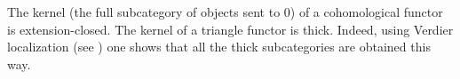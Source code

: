 \begin{exmp}
  The kernel (the full subcategory of objects sent to $0$) of a cohomological functor is extension-closed. The kernel of a triangle functor is thick. Indeed, using Verdier localization (see \cite{ver}) one shows that all the thick subcategories are obtained this way. 
\end{exmp}
% 
%
%

